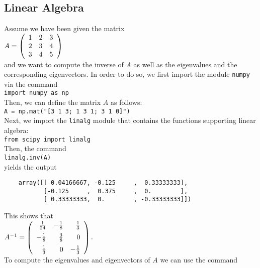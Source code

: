 \documentclass{article}
\begin{document}
\subsection{Linear Algebra}
Assume we have been given the matrix
\\[0.2cm]
\hspace*{1.3cm}
$A = \left(
\begin{array}[c]{lll}
  1 & 2 & 3 \\
  2 & 3 & 4 \\
  3 & 4 & 5
\end{array}
\right)
$
\\[0.2cm]
and we want to compute the inverse of $A$ as well as the eigenvalues and the corresponding
eigenvectors.  In order to do so, we first import the module \texttt{numpy} via the command
\\[0.2cm]
\hspace*{1.3cm}
\texttt{import numpy as np}
\\[0.2cm]
Then, we can define the matrix $A$ as follows:
\\[0.2cm]
\hspace*{1.3cm}
\texttt{A = np.mat("[3 1 3; 1 3 1; 3 1 0]")}
\\[0.2cm]
Next, we import the \texttt{linalg} module that contains the functions supporting linear algebra:
\\[0.2cm]
\hspace*{1.3cm}
\texttt{from scipy import linalg}
\\[0.2cm]
Then, the command
\\[0.2cm]
\hspace*{1.3cm}
\texttt{linalg.inv(A)}
\\[0.2cm]
yields the output
\begin{verbatim}
    array([[ 0.04166667, -0.125     ,  0.33333333],
           [-0.125     ,  0.375     ,  0.        ],
           [ 0.33333333,  0.        , -0.33333333]])
\end{verbatim}
This shows that
\\[0.2cm]
\hspace*{1.3cm}
$A^{-1} = \left(
\begin{array}[c]{rrr}
  \frac{1}{24} & -\frac{1}{8} & \frac{1}{3} \\[0.2cm]
 -\frac{1}{8}  &  \frac{3}{8} & 0           \\[0.2cm]
  \frac{1}{3}  & 0 & -\frac{1}{3}
\end{array}
\right).
$
\\[0.2cm]
To compute the eigenvalues and eigenvectors of $A$ we can use the command
\end{document}
